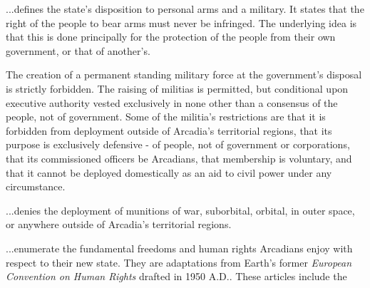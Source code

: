 \item %

...defines the state's disposition to personal arms and a military. It states that the right of the people to bear arms must never be infringed. The underlying idea is that this is done principally for the protection of the people from their own government, or that of another's.

The creation of a permanent standing military force at the government's disposal is strictly forbidden. The raising of militias is permitted, but conditional upon executive authority vested exclusively in none other than a consensus of the people, not of government. Some of the militia's restrictions are that it is forbidden from deployment outside of Arcadia's territorial regions, that its purpose is exclusively defensive - of people, not of government or corporations, that its commissioned officers be Arcadians, that membership is voluntary, and that it cannot be deployed domestically as an aid to civil power under any circumstance.

\item %

...denies the deployment of munitions of war, suborbital, orbital, in outer space, or anywhere outside of Arcadia's territorial regions.
\stopitemize

\startitemize[R][start=11]
\setupitemize[left=Article\space, right=\space---\space\\XXVII, stopper=]
\item %

...enumerate the fundamental freedoms and human rights Arcadians enjoy with respect to their new state. They are adaptations from Earth's former {\it European Convention on Human Rights} drafted in 1950 A.D.. These articles include the

